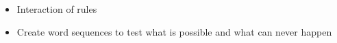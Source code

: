 


\begin{itemize}
\item Interaction of rules
\item Create word sequences to test what is possible and what can never happen
\end{itemize}










